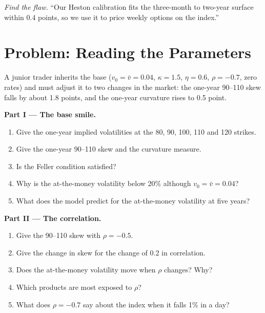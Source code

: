 \begin{exercise}[$\star\star\star$]\label{exo:dv:stochastic-volatility:8}
\emph{Find the flaw.} ``Our Heston calibration fits the three-month to two-year surface within 0.4 points, so we use
it to price weekly options on the index.''
\end{exercise}

\section{Problem: Reading the Parameters}

\begin{problem}\label{pb:dv:stochastic-volatility:1}
A junior trader inherits the base  ($v_0=\bar v=0.04$, $\kappa=1.5$, $\eta=0.6$, $\rho=-0.7$, zero rates)
and must adjust it to two changes in the market: the one-year 90--110 skew falls by about 1.8 points, and the one-year
curvature rises to 0.5 point.

\medskip\noindent\textbf{Part I --- The base smile.}
\begin{enumerate}
\item Give the one-year implied volatilities at the 80, 90, 100, 110 and 120 strikes.
\item Give the one-year 90--110 skew and the curvature measure.
\item Is the Feller condition satisfied?
\item Why is the at-the-money volatility below 20\% although $v_0=\bar v=0.04$?
\item What does the model predict for the at-the-money volatility at five years?
\end{enumerate}

\medskip\noindent\textbf{Part II --- The correlation.}
\begin{enumerate}[resume]
\item Give the 90--110 skew with $\rho=-0.5$.
\item Give the change in skew for the change of 0.2 in correlation.
\item Does the at-the-money volatility move when $\rho$ changes? Why?
\item Which products are most exposed to $\rho$?
\item What does $\rho=-0.7$ say about the index when it falls 1\% in a day?
\end{enumerate}


\end{problem}
